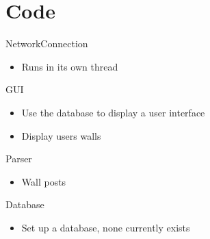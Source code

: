 \section{Code}

NetworkConnection
\begin{itemize}
\item Runs in its own thread
\end{itemize}
GUI
\begin{itemize}
\item Use the database to display a user interface
\item Display users walls
\end{itemize}
Parser
\begin{itemize}
\item Wall posts
\end{itemize}
Database
\begin{itemize}
\item Set up a database, none currently exists
\end{itemize}
